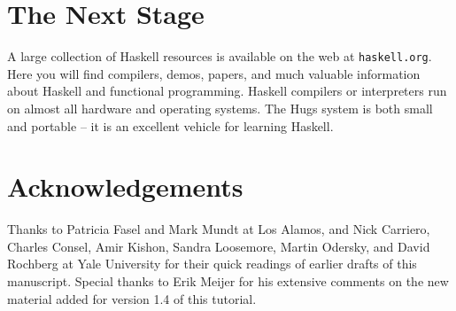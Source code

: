 

\section{The Next Stage}
A large collection of Haskell resources is available on the web at
\mbox{\tt haskell.org}.  Here you will find compilers, demos, papers, and much
valuable information about Haskell and functional programming.
Haskell compilers or interpreters run on almost all hardware and
operating systems.  The Hugs system is both small and portable -- it
is an excellent vehicle for learning Haskell. 

\section{Acknowledgements}

Thanks to Patricia Fasel and Mark Mundt at Los Alamos, and Nick
Carriero, Charles Consel, Amir Kishon, Sandra Loosemore, Martin
Odersky, and David Rochberg at Yale University for
their quick readings of earlier drafts of this manuscript.  Special
thanks to Erik Meijer for his extensive comments on the new material
added for version 1.4 of this tutorial.


